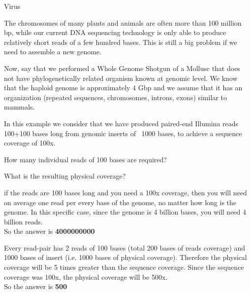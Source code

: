 \begin{Answer} [
  ref={ex35},
  number={1}
 ]

\Question Virus



\end{Answer}

\begin{Exercise} [
  label={ex36},
  origin={G. Valle}
 ]

The chromosomes of many plants and animals are often more than 100
million bp, while our current DNA sequencing technology is only able to produce
relatively short reads of a few hundred bases. This is still a big problem if
we need to assemble a new genome.

Now, say that we performed a Whole Genome Shotgun of a Mollusc that does not
have phylogenetically related organism known at genomic level. We know that the
haploid genome is approximately 4 Gbp and we assume that it has an organization
(repeated sequences, chromosomes, introns, exons) similar to mammals.

In this example we consider that we have produced paired-end Illumina reads
100+100 bases long from genomic inserts of ~1000 bases, to achieve a sequence
coverage of 100x.

\Question How many individual reads of 100 bases are required?

\Question What is the resulting physical coverage?
\end{Exercise}

\begin{Answer} [
  ref={ex36},
  number={1}
 ]

\Question if the reads are 100 bases long and you need a 100x coverage, then
you will need on average one read per every base of the genome, no matter how
long is the genome. In this specific case, since the genome is 4 billion bases,
you will need 4 billion reads.\\
So the answer is \textbf{4000000000}

\Question Every read-pair has 2 reads of 100 bases (total 200 bases of reads
coverage) and 1000 bases of insert (i.e. 1000 bases of physical coverage).
Therefore the physical coverage will be 5 times greater than the sequence
coverage. Since the sequence coverage was 100x, the physical coverage will be
500x.\\
So the answer is \textbf{500}
\end{Answer}

